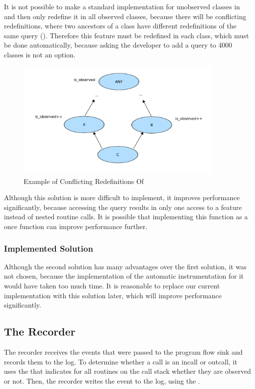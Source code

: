It is not possible to make a standard implementation for unobserved classes in  and then only redefine it in all observed classes, because there will be conflicting redefinitions, where two ancestors of a class have different redefinitions of the same query \cite{oosc2} (). Therefore this feature must be redefined in each class, which must be done automatically, because asking the developer to add a query to 4000 classes is not an option.
\begin{figure}[ht]
  \centering
  \includegraphics[width=0.9\textwidth]{illustrations/observed_query_conflicting_redefinitions}
  \caption{Example of Conflicting Redefinitions Of }
  \label{fig:observed_query_conflicting_redefinitions}
\end{figure}

Although this solution is more difficult to implement, it improves performance significantly, because accessing the query results in only one access to a feature instead of nested routine calls. It is possible that implementing this function as a once function can improve performance further.


\subsubsection {Implemented Solution}
Although the second solution has many advantages over the first solution, it was not chosen, because the implementation of the automatic instrumentation for it would have taken too much time. It is reasonable to replace our current implementation with this solution later, which will improve performance significantly.


\subsection{The Recorder}
The recorder receives the events that were passed to the program flow sink and records them to the log. To determine whether a call is an incall or outcall, it uses the  that indicates for all routines on the call stack whether they are observed or not. Then, the recorder writes the event to the log, using the .


